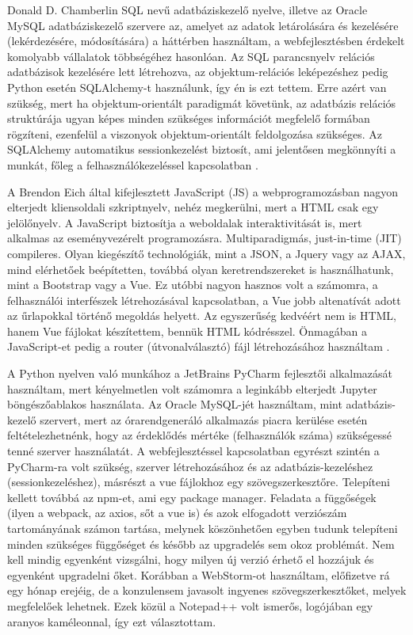 
Donald D. Chamberlin SQL nevű adatbáziskezelő nyelve, illetve az Oracle MySQL 
adatbáziskezelő szervere az, amelyet az adatok letárolására és kezelésére (lekérdezésére, 
módosítására) a háttérben használtam, a webfejlesztésben érdekelt komolyabb vállalatok 
többségéhez hasonlóan. Az SQL parancsnyelv relációs adatbázisok kezelésére lett létrehozva, 
az objektum-relációs leképezéshez pedig Python esetén SQLAlchemy-t használunk, így én is ezt 
tettem. Erre azért van szükség, mert ha objektum-orientált paradigmát követünk, az adatbázis 
relációs struktúrája ugyan képes minden szükséges információt megfelelő formában rögzíteni, 
ezenfelül a viszonyok objektum-orientált feldolgozása szükséges. Az SQLAlchemy automatikus 
sessionkezelést biztosít, ami jelentősen megkönnyíti a munkát, főleg a felhasználókezeléssel 
kapcsolatban \cite{copeland2008essential}.


A Brendon Eich által kifejlesztett JavaScript (JS) a webprogramozásban nagyon elterjedt
kliensoldali szkriptnyelv, nehéz megkerülni, mert a HTML csak egy jelölőnyelv. A JavaScript 
biztosítja a weboldalak interaktivitását is, mert alkalmas az eseményvezérelt programozásra. 
Multiparadigmás, just-in-time (JIT) compileres. Olyan kiegészítő technológiák, mint a JSON, 
a Jquery vagy az AJAX, mind elérhetőek beépítetten, továbbá olyan keretrendszereket is 
használhatunk, mint a Bootstrap vagy a Vue. Ez utóbbi nagyon hasznos volt a számomra, a 
felhasználói interfészek létrehozásával kapcsolatban, a Vue jobb altenatívát adott az 
űrlapokkal történő megoldás helyett. Az egyszerűség kedvéért nem is HTML, hanem Vue fájlokat
készítettem, bennük HTML kódrésszel. Önmagában a JavaScript-et pedig a router 
(útvonalválasztó) fájl létrehozásához használtam \cite{filipova2016learning}.


A Python nyelven való munkához a JetBrains PyCharm fejlesztői alkalmazását használtam, mert kényelmetlen volt számomra a leginkább elterjedt Jupyter böngészőablakos használata. Az Oracle MySQL-jét használtam, mint adatbázis-kezelő szervert, mert az órarendgeneráló alkalmazás piacra kerülése esetén feltételezhetnénk, hogy az érdeklődés mértéke (felhasználók száma) szükségessé tenné szerver használatát. A webfejlesztéssel kapcsolatban egyrészt szintén a PyCharm-ra volt szükség, szerver létrehozásához és az adatbázis-kezeléshez (sessionkezeléshez), másrészt a vue fájlokhoz egy szövegszerkesztőre. Telepíteni kellett továbbá az npm-et, ami egy package manager. Feladata a függőségek (ilyen a webpack, az axios, sőt a vue is) és azok elfogadott verziószám tartományának számon tartása, melynek köszönhetően egyben tudunk telepíteni minden szükséges függőséget és később az upgradelés sem okoz problémát. Nem kell mindig egyenként vizsgálni, hogy milyen új verzió érhető el hozzájuk és egyenként upgradelni őket. Korábban a WebStorm-ot használtam, előfizetve rá egy hónap erejéig, de a konzulensem javasolt ingyenes szövegszerkesztőket, melyek megfelelőek lehetnek. Ezek közül a Notepad++ volt ismerős, logójában egy aranyos kaméleonnal, így ezt választottam.

